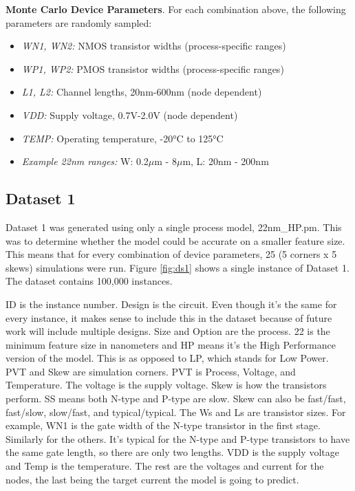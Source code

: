 \documentclass[10pt,twocolumn,letterpaper]{article}
\begin{document}
\textbf{\normalsize Monte Carlo Device Parameters}. For each combination above, the following parameters are randomly sampled:

\begin{itemize}[nosep]
\item \textit{WN1, WN2:} NMOS transistor widths (process-specific ranges)
\item \textit{WP1, WP2:} PMOS transistor widths (process-specific ranges)
\item \textit{L1, L2:} Channel lengths, 20nm-600nm (node dependent)
\item \textit{VDD:} Supply voltage, 0.7V-2.0V (node dependent)
\item \textit{TEMP:} Operating temperature, -20°C to 125°C
\item \textit{Example 22nm ranges:} W: 0.2$\mu$m - 8$\mu$m, L: 20nm - 200nm\\
\end{itemize}

\subsection{Dataset 1}
\label{subsec:dataset1}

Dataset 1 was generated using only a single process model, 22nm\_HP.pm.  This was to determine whether the model could be accurate on a smaller feature size.  This means that for every combination of device parameters, 25 (5 corners x 5 skews) simulations were run.  Figure \ref{fig:ds1} shows a single instance of Dataset 1.  The dataset contains 100,000 instances.

ID is the instance number.  Design is the circuit.  Even though it’s the same for every instance, it makes sense to include this in the dataset because of future work will include multiple designs.  Size and Option are the process.  22 is the minimum feature size in nanometers and HP means it’s the High Performance version of the model.  This is as opposed to LP, which stands for Low Power.  PVT and Skew are simulation corners.  PVT is Process, Voltage, and Temperature.  The voltage is the supply voltage.  Skew is how the transistors perform.  SS means both N-type and P-type are slow.  Skew can also be fast/fast, fast/slow, slow/fast, and typical/typical.  The Ws and Ls are transistor sizes.  For example, WN1 is the gate width of the N-type transistor in the first stage.  Similarly for the others.  It’s typical for the N-type and P-type transistors to have the same gate length, so there are only two lengths.  VDD is the supply voltage and Temp is the temperature.  The rest are the voltages and current for the nodes, the last being the target current the model is going to predict.
\end{document}

